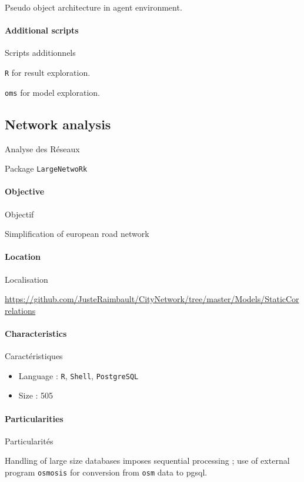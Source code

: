 Pseudo object architecture in agent environment.

\paragraph{Additional scripts}{Scripts additionnels}

\texttt{R} for result exploration.

\texttt{oms} for model exploration.






\subsection{Network analysis}{Analyse des Réseaux}

Package \texttt{LargeNetwoRk}

\paragraph{Objective}{Objectif}

Simplification of european road network

\paragraph{Location}{Localisation}

\url{https://github.com/JusteRaimbault/CityNetwork/tree/master/Models/StaticCorrelations}

\paragraph{Characteristics}{Caractéristiques}

\begin{itemize}
\item Language : \texttt{R}, \texttt{Shell}, \texttt{PostgreSQL}
\item Size : 505
\end{itemize}


\paragraph{Particularities}{Particularités}

Handling of large size databases imposes sequential processing ; use of external program \texttt{osmosis} for conversion from \texttt{osm} data to pgsql.

